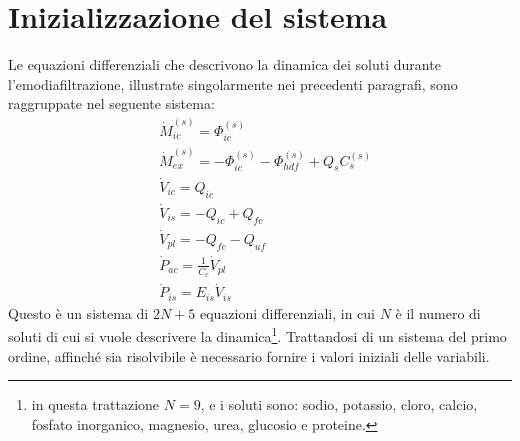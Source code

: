 \section{Inizializzazione del sistema}
Le equazioni differenziali che descrivono la dinamica dei soluti durante l'emodiafiltrazione, illustrate singolarmente nei precedenti paragrafi, sono raggruppate nel seguente sistema:
\begin{align}
		&\dot{M}_{ic}^{(s)} = \Phi_{ic}^{(s)}                                    \label{dMic}\\
		&\dot{M}_{ex}^{(s)} = -\Phi_{ic}^{(s)} -\Phi_{hdf}^{(s)} + Q_s C_s^{(s)} \label{dMex}\\ 
		&\dot{V}_{ic}       = Q_{ic}                                             \label{dVic}\\
		&\dot{V}_{is}       = - Q_{ic} + Q_{fc}                                  \label{dVis}\\
		&\dot{V}_{pl}       = -Q_{fc} -Q_{uf}                                    \label{dVpl}\\
		&\dot{P}_{ac}       = \frac{1}{C_c} \dot{V}_{pl}                         \label{dPac}\\
		&\dot{P}_{is}       = E_{is}\dot{V}_{is}                                 \label{dPis}
\end{align}
Questo è un sistema di $2N+5$ equazioni differenziali, in cui $N$ è il numero di soluti di cui si vuole descrivere la dinamica\footnote{in questa trattazione $N=9$, e i soluti sono: sodio, potassio, cloro, calcio, fosfato inorganico, magnesio, urea, glucosio e proteine.}. Trattandosi di un sistema del primo ordine, affinché sia risolvibile è necessario fornire i valori iniziali delle variabili.


